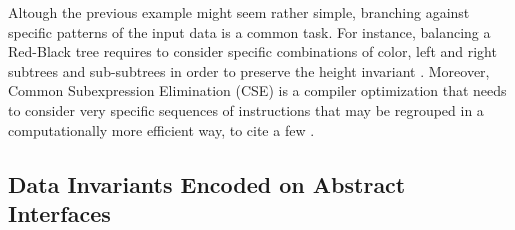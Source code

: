 



Altough the previous example might seem rather simple, branching against
specific patterns of the input data is a common task.
%
For instance, balancing a Red-Black tree requires to consider specific
combinations of color, left and right subtrees and sub-subtrees in order to
preserve the height invariant \tocite.
%
Moreover, Common Subexpression Elimination (CSE) is a compiler optimization that
needs to consider very specific sequences of instructions that may be regrouped
in a computationally more efficient way, to cite a few \tocite.



\subsection*{\textbf{Data Invariants Encoded on Abstract Interfaces}}

